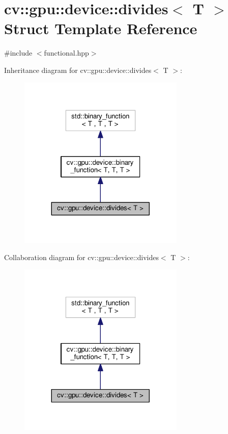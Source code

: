 \hypertarget{structcv_1_1gpu_1_1device_1_1divides}{\section{cv\-:\-:gpu\-:\-:device\-:\-:divides$<$ T $>$ Struct Template Reference}
\label{structcv_1_1gpu_1_1device_1_1divides}
}


{\ttfamily \#include $<$functional.\-hpp$>$}



Inheritance diagram for cv\-:\-:gpu\-:\-:device\-:\-:divides$<$ T $>$\-:\nopagebreak
\begin{figure}[H]
\begin{center}
\leavevmode
\includegraphics[width=224pt]{structcv_1_1gpu_1_1device_1_1divides__inherit__graph}
\end{center}
\end{figure}


Collaboration diagram for cv\-:\-:gpu\-:\-:device\-:\-:divides$<$ T $>$\-:\nopagebreak
\begin{figure}[H]
\begin{center}
\leavevmode
\includegraphics[width=224pt]{structcv_1_1gpu_1_1device_1_1divides__coll__graph}
\end{center}
\end{figure}
